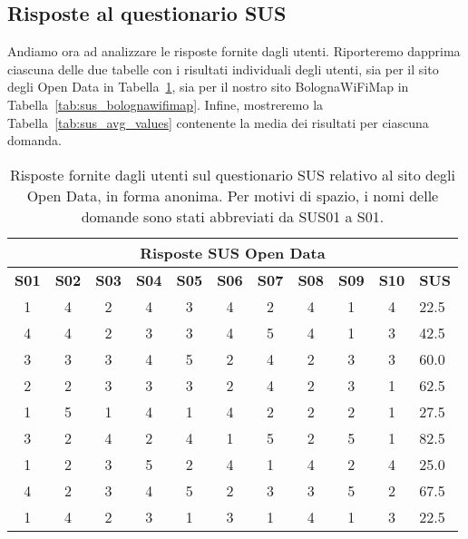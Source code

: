 \subsection{Risposte al questionario SUS}
Andiamo ora ad analizzare le risposte fornite dagli utenti. Riporteremo dapprima ciascuna delle due tabelle con i risultati individuali degli utenti, sia per il sito degli Open Data in Tabella~\ref{tab:sus_opendata}, sia per il nostro sito BolognaWiFiMap in Tabella~\ref{tab:sus_bolognawifimap}. Infine, mostreremo la Tabella~\ref{tab:sus_avg_values} contenente la media dei risultati per ciascuna domanda.

\begin{center}
    \begin{table}[H]
        \centering
        \begin{tabularx}{\textwidth}{|c|c|c|c|c|c|c|c|c|c|X|}
            \hline
            \multicolumn{11}{|c|}{\textbf{Risposte SUS Open Data}} \\
            \hline
            \textbf{S01} & \textbf{S02} & \textbf{S03} & \textbf{S04} & \textbf{S05} & \textbf{S06} & \textbf{S07} & \textbf{S08} & \textbf{S09} & \textbf{S10} & \textbf{SUS} \\
            \hline
            1 & 4 & 2 & 4 & 3 & 4 & 2 & 4 & 1 & 4 & 22.5 \\
            4 & 4 & 2 & 3 & 3 & 4 & 5 & 4 & 1 & 3 & 42.5 \\
            3 & 3 & 3 & 4 & 5 & 2 & 4 & 2 & 3 & 3 & 60.0 \\
            2 & 2 & 3 & 3 & 3 & 2 & 4 & 2 & 3 & 1 & 62.5 \\
            1 & 5 & 1 & 4 & 1 & 4 & 2 & 2 & 2 & 1 & 27.5 \\
            3 & 2 & 4 & 2 & 4 & 1 & 5 & 2 & 5 & 1 & 82.5 \\
            1 & 2 & 3 & 5 & 2 & 4 & 1 & 4 & 2 & 4 & 25.0 \\
            4 & 2 & 3 & 4 & 5 & 2 & 3 & 3 & 5 & 2 & 67.5 \\
            1 & 4 & 2 & 3 & 1 & 3 & 1 & 4 & 1 & 3 & 22.5 \\
            \hline
        \end{tabularx}
        \caption[Risposte del questionario SUS sul sito degli Open Data]{Risposte fornite dagli utenti sul questionario SUS relativo al sito degli Open Data, in forma anonima. Per motivi di spazio, i nomi delle domande sono stati abbreviati da SUS01 a S01.}
        \label{tab:sus_opendata}
    \end{table}
\end{center}

